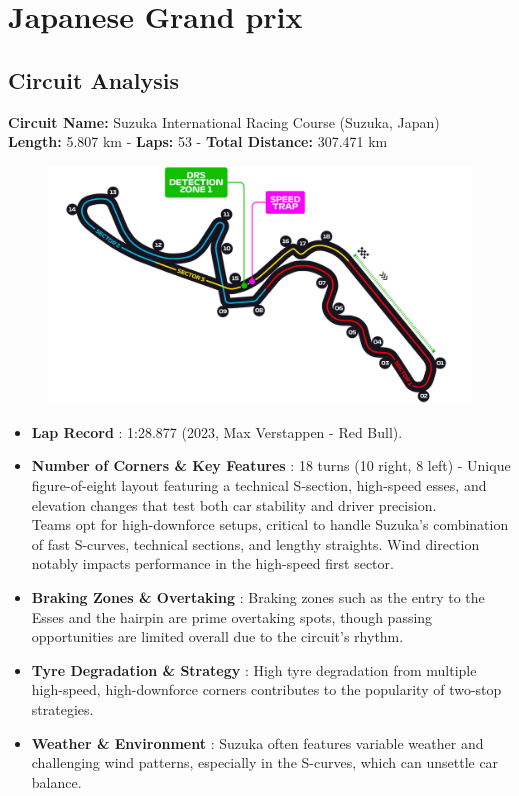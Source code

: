 \section{Japanese Grand prix}

\subsection{Circuit Analysis}

\textbf{Circuit Name:} Suzuka International Racing Course (Suzuka, Japan) \\
\textbf{Length:} 5.807 km - \textbf{Laps:} 53 - \textbf{Total Distance:} 307.471 km

\begin{figure}[H]
    \centering
    \includegraphics[width=0.75\linewidth]{images/4.Japan_Circuit.jpg}
\end{figure}

\begin{itemize}
    \item \textbf{Lap Record} : 1:28.877 (2023, Max Verstappen - Red Bull).
    
    \item \textbf{Number of Corners \& Key Features} : 18 turns (10 right, 8 left) - Unique figure-of-eight layout featuring a technical S-section, high-speed esses, and elevation changes that test both car stability and driver precision.\\
    Teams opt for high-downforce setups, critical to handle Suzuka’s combination of fast S-curves, technical sections, and lengthy straights. Wind direction notably impacts performance in the high-speed first sector.
    
    \item \textbf{Braking Zones \& Overtaking} : Braking zones such as the entry to the Esses and the hairpin are prime overtaking spots, though passing opportunities are limited overall due to the circuit’s rhythm.
    
    \item \textbf{Tyre Degradation \& Strategy} : High tyre degradation from multiple high-speed, high-downforce corners contributes to the popularity of two-stop strategies.

    \item \textbf{Weather \& Environment} : Suzuka often features variable weather and challenging wind patterns, especially in the S-curves, which can unsettle car balance.
\end{itemize}

